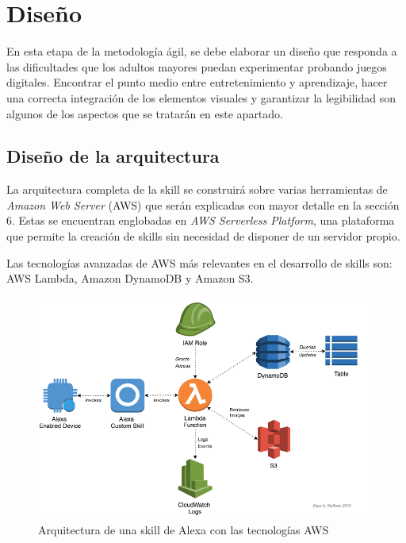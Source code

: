 \section{Diseño}

En esta etapa de la metodología ágil, se debe elaborar un diseño que responda a las dificultades que los adultos mayores puedan experimentar probando juegos digitales. Encontrar el punto medio entre entretenimiento y aprendizaje, hacer una correcta integración de los elementos visuales y garantizar la legibilidad son algunos de los aspectos que se tratarán en este apartado.

\subsection{Diseño de la arquitectura}

La arquitectura completa de la skill se construirá sobre varias herramientas de \textit{Amazon Web Server} (AWS) que serán explicadas con mayor detalle en la sección 6. Estas se encuentran englobadas en \textit{AWS Serverless Platform}, una plataforma que permite la creación de skills sin necesidad de disponer de un servidor propio. 

Las tecnologías avanzadas de AWS más relevantes en el desarrollo de skills son: AWS Lambda, Amazon DynamoDB y Amazon S3.

\begin{figure}[H]
	\centering
	\includegraphics[width=0.98\textwidth]{imgs/arquitectura-skill.png}
	\caption{Arquitectura de una skill de Alexa con las tecnologías AWS \parencite{arquitecturaSkill}}
	\label{fig:arquitectura-skill}
\end{figure}


